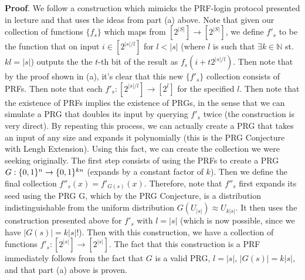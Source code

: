 \documentclass{article}
\begin{document}
\begin{enumerate}[,start=4]
\begin{enumerate}[noitemsep,topsep=\mdcompacttopsep,label=\alph*.]
\begin{mdbmarginx}{1ex}{0pt}{1ex}{0pt}%
\noindent{}\textbf{Proof}.  We follow a construction which mimicks the PRF-login protocol presented in lecture
and that uses the ideas from part (a) above. Note that given our collection of functions 
$\{f_s \}$ which maps from $[2^{|S|}] \to [2^{|S|}]$, we define $f'_s$ to be the function that 
on input $i \in [2^{|s|/l}]$ for $l < |s|$ (where $l$ is such that $\exists k \in \mathbb{N}$ st.
$kl = |s|$) outputs the the $t$-th bit of the result as
$f_s(i + t2^{|s|/l})$. Then note that by the proof shown in (a), it's clear that this new
$\{f'_s \}$ collection consists of PRFs. Then note that each $f'_s: [2^{|s|/l}] \to [2^l]$ for
the specified $l$. Then note that the existence of PRFs implies the existence of PRGs, in the
sense that we can simulate a PRG that doubles its input by querying $f'_s$ twice (the construction
is very direct). By repeating this process, we can actually create a PRG that takes an input 
of any size and expands it polynomially (this is the PRG Conjecture with Lengh Extension). Using
this fact, we can create the collection we were seeking originally. The first step consists
of using the PRFs to create a PRG $G: \{0,1\}^n \to \{0,1\}^{kn}$ (expands by a constant factor of $k$).
Then we define the final collection $f''_s(x) = f'_{G(s)}(x)$. Therefore, note that $f''_s$ first
expands its seed using the PRG G, which by the PRG Conjecture, is a distribution 
indistinguishable from the uniform distribution $G(U_{|s|}) \approx U_{k|s|}$. It then uses 
the construction presented above for $f'_s$ with $l = |s|$ (which is now possible, since we have
$|G(s)| = k|s|$!). Then with this construction, we have a collection of functions $f'_s: [2^{|s|}] \to [2^{|s|}]$.
The fact that this construction is a PRF immediately follows from the fact that $G$ is a valid
PRG, $l = |s|$, $|G(s)| = k|s|$, and that part (a) above is proven.
\mdfloatright{\ensuremath{\Box}}%
\end{mdbmarginx}%


\end{enumerate}
\end{enumerate}
\end{document}
